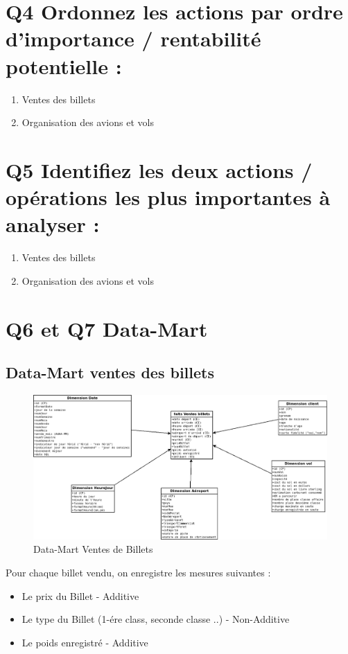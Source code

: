 \documentclass[oneside,13pt,a4paper]{article}
\begin{document}
\section{Q4 Ordonnez les actions par ordre d’importance / rentabilité potentielle : }
\begin{enumerate}
  \item Ventes des billets
  \item Organisation des avions et vols
\end{enumerate} 

\section{Q5 Identifiez les deux actions / opérations les plus importantes à analyser : }

\begin{enumerate}
  \item Ventes des billets
  \item Organisation des avions et vols
\end{enumerate}

\section{Q6 et Q7 Data-Mart}

\subsection{Data-Mart ventes des billets}

\begin{figure}[h]
  \centering
  \includegraphics[width=1\textwidth]{img/VenteBillet.png}
  \caption{Data-Mart Ventes de Billets}
\end{figure}

Pour chaque billet vendu, on enregistre les mesures suivantes :
\begin{itemize}
  \item Le prix du Billet - Additive
  \item Le type du Billet (1-ére class, seconde classe ..) - Non-Additive
  \item Le poids enregistré - Additive
\end{itemize}
\end{document}
